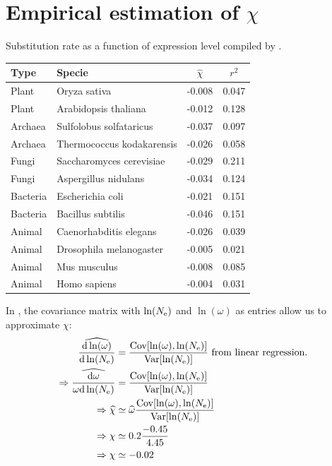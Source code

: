 \documentclass{article}
\renewcommand*{\bm}[1]{#1}%
\begin{document}
\section{Empirical estimation of $\bm{\chi}$}
Substitution rate as a function of expression level compiled by \citep{Zhang2015}.
\begin{table}[ht]
	\centering
	\begin{tabular}{|l|l|c|c|}
		\hline
		Type & Specie & $\hat{\chi}$ & $r^2$ \\ 
		\hline
		Plant & Oryza sativa & -0.008 & 0.047 \\ 
		Plant & Arabidopsis thaliana & -0.012 & 0.128 \\ 
		Archaea & Sulfolobus solfataricus & -0.037 & 0.097 \\ 
		Archaea & Thermococcus kodakarensis & -0.026 & 0.058 \\ 
		Fungi & Saccharomyces cerevisiae & -0.029 & 0.211 \\ 
		Fungi & Aspergillus nidulans & -0.034 & 0.124 \\ 
		Bacteria & Escherichia coli & -0.021 & 0.151 \\ 
		Bacteria & Bacillus subtilis & -0.046 & 0.151 \\ 
		Animal & Caenorhabditis elegans & -0.026 & 0.039 \\ 
		Animal & Drosophila melanogaster & -0.005 & 0.021 \\ 
		Animal & Mus musculus & -0.008 & 0.085 \\ 
		Animal & Homo sapiens & -0.004 & 0.031 \\ 
		\hline
	\end{tabular}
\end{table}
In \citep{Brevet2019}, the covariance matrix with $\ln(N_{\mathrm{e}})$ and $\ln(\omega)$ as entries allow us to approximate $\chi$:
\begin{align}
	\widehat{\frac{\mathrm{d} \ln (\omega)}{\mathrm{d} \ln (N_{\mathrm{e}})}} & = \dfrac{\text{Cov}[\ln(\omega), \ln(N_{\mathrm{e}})]}{\text{Var}[\ln(N_{\mathrm{e}})]}\text{ from linear regression.} \\
	\Rightarrow \widehat{\frac{\mathrm{d} \omega}{\omega \mathrm{d} \ln (N_{\mathrm{e}})}} & = \dfrac{\text{Cov}[\ln(\omega), \ln(N_{\mathrm{e}})]}{\text{Var}[\ln(N_{\mathrm{e}})]} \\
	\Rightarrow \widehat{\chi} & \simeq \widehat{\omega} \dfrac{\text{Cov}[\ln(\omega), \ln(N_{\mathrm{e}})]}{\text{Var}[\ln(N_{\mathrm{e}})]} \\
	\Rightarrow \chi & \simeq 0.2 \dfrac{-0.45}{4.45} \\
	\Rightarrow \chi & \simeq - 0.02 
\end{align}
\end{document}
